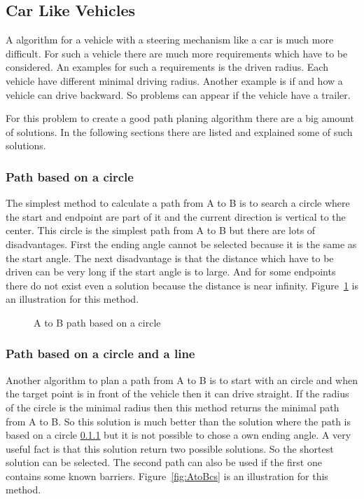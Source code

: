 \subsection{Car Like Vehicles}
A algorithm for a vehicle with a steering mechanism like a car is much more difficult.
For such a vehicle there are much more requirements which have to be considered.
An examples for such a requirements is the driven radius.
Each vehicle have different minimal driving radius.
Another example is if and how a vehicle can drive backward.
So problems can appear if the vehicle have a trailer.

For this problem to create a good path planing algorithm there are a big amount of solutions.
In the following sections there are listed and explained some of such solutions.


\subsubsection{Path based on a circle}\label{sec:AtoBcircle}
The simplest method to calculate a path from A to B is to search a circle where the start and endpoint are part of it and the current direction is vertical to the center.
This circle is the simplest path from A to B but there are lots of disadvantages.
First the ending angle cannot be selected because it is the same as the start angle.
The next disadvantage is that the distance which have to be driven can be very long if the start angle is to large.
And for some endpoints there do not exist even a solution because the distance is near infinity.
Figure~\ref{fig:AtoBcircle} is an illustration for this method.

\begin{figure}

\caption{A to B path based on a circle}
\label{fig:AtoBcircle}
\end{figure}


\subsubsection{Path based on a circle and a line}\label{sec:AtoBcs}
Another algorithm to plan a path from A to B is to start with an circle and when the target point is in front of the vehicle then it can drive straight.
If the radius of the circle is the minimal radius then this method returns the minimal path from A to B.
So this solution is much better than the solution where the path is based on a circle \ref{sec:AtoBcircle} but it is not possible to chose a own ending angle.
A very useful fact is that this solution return two possible solutions.
So the shortest solution can be selected.
The second path can also be used if the first one contains some known barriers.
Figure~\ref{fig:AtoBcs} is an illustration for this method.

